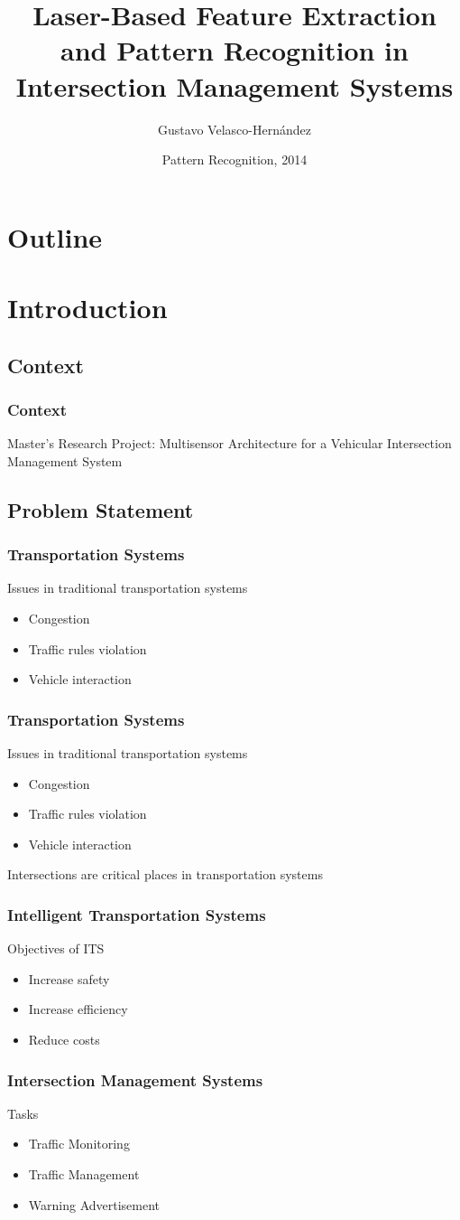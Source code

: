 \documentclass[table]{beamer}
\title[Laser-Based Feature Extraction and Pattern Recognition in IMS]{Laser-Based Feature Extraction and Pattern Recognition in Intersection Management Systems}
\author{Gustavo Velasco-Hernández}
\institute[Universidad del Valle]
{
	
}
\date{Pattern Recognition, 2014}
\begin{document}
\frame{\titlepage}
\section*{Outline}

\frame{\tableofcontents}
\section{Introduction}

\subsection{Context}
\frame
{
	\frametitle{Context}
	Master's Research Project:
	Multisensor Architecture for a Vehicular Intersection Management System
}
\subsection{Problem Statement}
\frame
{
	\frametitle{Transportation Systems}
	Issues in traditional transportation systems
	\begin{itemize}
		\item Congestion
		\item Traffic rules violation
		\item Vehicle interaction
	\end{itemize}
}

\frame
{
	\frametitle{Transportation Systems}
	Issues in traditional transportation systems
	\begin{itemize}
		\item Congestion
		\item Traffic rules violation
		\item Vehicle interaction
	\end{itemize}
	Intersections are critical places in transportation systems
}

\frame
{
	\frametitle{Intelligent Transportation Systems}
	Objectives of ITS
	\begin{itemize}
		\item Increase safety
		\item Increase efficiency
		\item Reduce costs
	\end{itemize}
}

\frame
{
	\frametitle{Intersection Management Systems}
	Tasks
	\begin{itemize}
		\item Traffic Monitoring
		\item Traffic Management
		\item Warning Advertisement
	\end{itemize}
}
\end{document}
